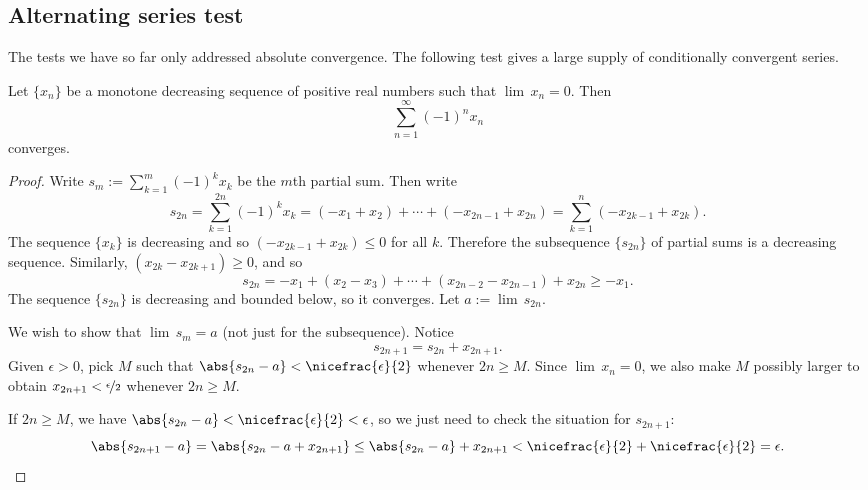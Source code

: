 \documentclass[12pt]{book}
\begin{document}
\subsection*{Alternating series test}

The tests we have so far only addressed absolute convergence.
The
following test gives a large supply of conditionally convergent series.

\begin{prop}
Let $\{ x_n \}$ be a monotone decreasing sequence of positive real numbers such
that $\lim\, x_n = 0$.
Then
\begin{equation*}
\sum_{n=1}^\infty {(-1)}^n x_n
\end{equation*}
converges.
\end{prop}

\begin{proof}
Write $s_m := \sum_{k=1}^m {(-1)}^k x_k$ be the $m$th partial sum.
Then write
\begin{equation*}
s_{2n} =
\sum_{k=1}^{2n} {(-1)}^k x_k
=
(-x_1 + x_2) + \cdots + (-x_{2n-1} + x_{2n})
=
\sum_{k=1}^{n} (-x_{2k-1} + x_{2k}) .
\end{equation*}
The sequence $\{ x_k \}$ is decreasing and so $(-x_{2k-1}+x_{2k}) \leq 0$
for all $k$.
Therefore the subsequence $\{ s_{2n} \}$ of partial sums
is a decreasing sequence.
Similarly, $(x_{2k}-x_{2k+1}) \geq 0$, and so
\begin{equation*}
s_{2n} = - x_1 + ( x_2 - x_3 ) + \cdots + ( x_{2n-2} - x_{2n-1} ) + x_{2n}
\geq -x_1 .
\end{equation*}
The sequence $\{ s_{2n} \}$ is decreasing and bounded below, so it converges.
Let $a := \lim\, s_{2n}$.

We wish to show that $\lim\, s_m = a$ (not just for the subsequence).
Notice
\begin{equation*}
s_{2n+1} = s_{2n} + x_{2n+1} .
\end{equation*}
Given $\epsilon > 0$, pick $M$ such that $\abs{s_{2n}-a} <
\nicefrac{\epsilon}{2}$ whenever $2n \geq M$.
Since $\lim\, x_n = 0$, we also
make $M$ possibly larger
to obtain
$x_{2n+1} < \nicefrac{\epsilon}{2}$ whenever $2n \geq M$.

If $2n \geq M$, we have
$\abs{s_{2n}-a} < \nicefrac{\epsilon}{2} < \epsilon$, so we just need
to check the situation for $s_{2n+1}$:
\begin{equation*}
\abs{s_{2n+1}-a} = 
\abs{s_{2n}-a + x_{2n+1}} \leq
\abs{s_{2n}-a} + x_{2n+1} < 
\nicefrac{\epsilon}{2}+ \nicefrac{\epsilon}{2} = \epsilon .\qedhere
\end{equation*}
\end{proof}
\end{document}
